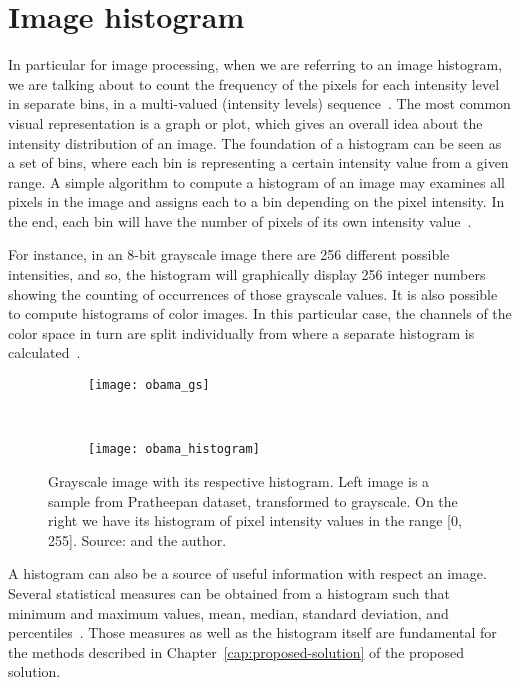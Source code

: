 \section{Image histogram}
\label{sec:image_histogram}
In particular for image processing, when we are referring to an image histogram, we are talking about to count the frequency of the pixels for each intensity level in separate bins, in a multi-valued (intensity levels) sequence~\citep{fisher:03}. The most common visual representation is a graph or plot, which gives an overall idea about the intensity distribution of an image. The foundation of a histogram can be seen as a set of bins, where each bin is representing a certain intensity value from a given range. A simple algorithm to compute a histogram of an image may examines all pixels in the image and assigns each to a bin depending on the pixel intensity. In the end, each bin will have the number of pixels of its own intensity value~\citep{gonzalez:02}.

For instance, in an 8-bit grayscale image there are 256 different possible intensities, and so, the histogram will graphically display 256 integer numbers showing the counting of occurrences of those grayscale values. It is also possible to compute histograms of color images. In this particular case, the channels of the color space in turn are split individually from where a separate histogram is calculated~\citep{fisher:03}.

\begin{figure}[H]
    \centering
    \begin{subfigure}[t]{0.4\textwidth}
        \texttt{[image: obama\_gs]}
    \end{subfigure}
    ~
    \begin{subfigure}[t]{0.54\textwidth}
        \texttt{[image: obama\_histogram]}
    \end{subfigure}
    \caption[Grayscale image with its respective histogram]{Grayscale image with its respective histogram. Left image is a sample from Pratheepan dataset, transformed to grayscale. On the right we have its histogram of pixel intensity values in the range [0, 255]. Source: \citet{tan:12} and the author.}
    \label{fig:obama_hist}
\end{figure}

A histogram can also be a source of useful information with respect an image. Several statistical measures can be obtained from a histogram such that minimum and maximum values, mean, median, standard deviation, and percentiles~\citep{pedrini:08}. Those measures as well as the histogram itself are fundamental for the methods described in Chapter~\ref{cap:proposed-solution} of the proposed solution.


